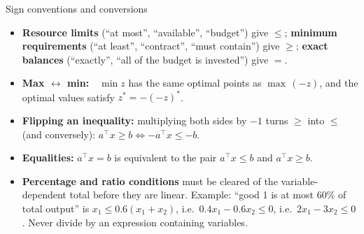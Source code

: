\begin{rulebox}{Sign conventions and conversions}
\begin{itemize}[leftmargin=1.6em,itemsep=0.3ex]
  \item \textbf{Resource limits} (``at most'', ``available'', ``budget'')
        give $\le$; \textbf{minimum requirements} (``at least'',
        ``contract'', ``must contain'') give $\ge$; \textbf{exact balances}
        (``exactly'', ``all of the budget is invested'') give $=$.
  \item \textbf{Max $\leftrightarrow$ min:}\ \
        $\min z$ has the same optimal points as $\max\,(-z)$, and the
        optimal values satisfy $z^{*}=-(-z)^{*}$.
  \item \textbf{Flipping an inequality:} multiplying both sides by $-1$
        turns $\ge$ into $\le$ (and conversely):
        $a^{\top}x\ge b \iff -a^{\top}x\le -b$.
  \item \textbf{Equalities:} $a^{\top}x=b$ is equivalent to the pair
        $a^{\top}x\le b$ and $a^{\top}x\ge b$.
  \item \textbf{Percentage and ratio conditions} must be cleared of the
        variable-dependent total before they are linear. Example: ``good 1
        is at most $60\%$ of total output'' is
        $x_1\le 0.6(x_1+x_2)$, i.e.\ $0.4x_1-0.6x_2\le 0$, i.e.\
        $2x_1-3x_2\le 0$. Never divide by an expression containing
        variables.
\end{itemize}
\end{rulebox}

